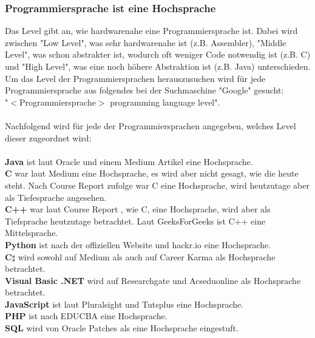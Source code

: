 \documentclass[ngerman]{article}
\begin{document}
    \subsubsection{Programmiersprache ist eine Hochsprache}
    \label{GrundlagenHochsprachen}
    Das Level gibt an, wie hardwarenahe eine Programmiersprache ist. Dabei wird zwischen "Low Level", was sehr hardwarenahe ist (z.B. Assembler), "Middle Level", was schon abstrakter ist, wodurch oft weniger Code notwendig ist (z.B. C) und "High Level", was eine noch höhere Abstraktion ist (z.B. Java) unterschieden.\\
    Um das Level der Programmiersprachen herauszusuchen wird für jede Programmiersprache aus  folgendes bei der Suchmaschine "Google" gesucht:\\
    "$<$Programmiersprache$>$ programming language level".\\\\
    Nachfolgend wird für jede der Programmiersprachen angegeben, welches Level dieser zugeordnet wird:\\\\
    \textbf{Java} ist laut Oracle \cite{JavaLevel1} und einem Medium Artikel \cite{JavaLevel2} eine Hochsprache.\\
    \textbf{C} war laut Medium \cite{CLevel2} eine Hochsprache, es wird aber nicht gesagt, wie die heute steht. Nach Course Report \cite{CLevel1} zufolge war C eine Hochsprache, wird heutzutage aber als Tiefesprache angesehen.\\
    \textbf{C++} war laut Course Report \cite{CLevel1}, wie C, eine Hochsprache, wird aber als Tiefsprache heutzutage betrachtet. Laut GeeksForGeeks \cite{C++Level1} ist C++ eine Mittelsprache.\\
    \textbf{Python} ist nach der offiziellen Website \cite{PythonLevel1} und hackr.io \cite{PythonLevel2} eine Hochsprache.\\
    \textbf{C$\sharp$} wird sowohl auf Medium \cite{CSLevel1} als auch auf Career Karma \cite{CSLevel2} als Hochsprache betrachtet.\\
    \textbf{Visual Basic .NET} wird auf Researchgate \cite{VBNLevel1} und Acseduonline \cite{VBNLevel2} als Hochsprache betrachtet.\\
    \textbf{JavaScript} ist laut Pluralsight \cite{JSL1} und Tutsplus \cite{JSL2} eine Hochsprache.\\
    \textbf{PHP} ist nach EDUCBA \cite{PHPLevel} eine Hochsprache.\\
    \textbf{SQL} wird von Oracle Patches \cite{SQLLevel} als eine Hochsprache eingestuft.\\
\end{document}
